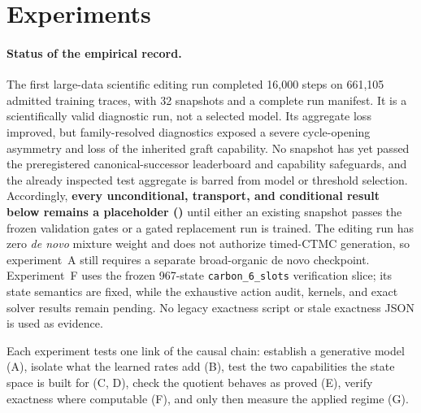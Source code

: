 \documentclass{article}
\theoremstyle{definition}
\theoremstyle{remark}
\begin{document}
\section{Experiments}
\label{sec:experiments}

\paragraph{Status of the empirical record.}
The first large-data scientific editing run completed 16,000 steps on 661,105 admitted training traces, with 32 snapshots and a complete run manifest. It is a scientifically valid diagnostic run, not a selected model. Its aggregate loss improved, but family-resolved diagnostics exposed a severe cycle-opening asymmetry and loss of the inherited graft capability. No snapshot has yet passed the preregistered canonical-successor leaderboard and capability safeguards, and the already inspected test aggregate is barred from model or threshold selection. Accordingly, \textbf{every unconditional, transport, and conditional result below remains a placeholder (\XXX)} until either an existing snapshot passes the frozen validation gates or a gated replacement run is trained. The editing run has zero \emph{de novo} mixture weight and does not authorize timed-CTMC generation, so experiment~A still requires a separate broad-organic de novo checkpoint. Experiment~F uses the frozen 967-state \texttt{carbon\_6\_slots} verification slice; its state semantics are fixed, while the exhaustive action audit, kernels, and exact solver results remain pending. No legacy exactness script or stale exactness JSON is used as evidence.

Each experiment tests one link of the causal chain: establish a generative model (A), isolate what the learned rates add (B), test the two capabilities the state space is built for (C, D), check the quotient behaves as proved (E), verify exactness where computable (F), and only then measure the applied regime (G).
\end{document}
